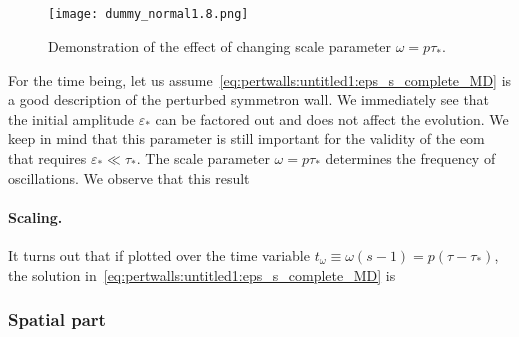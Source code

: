     
    

    
\begin{draft}
    

\subsection{}
    \begin{figure}[h]
        \centering
        \texttt{[image: dummy\_normal1.8.png]}
        \caption{Demonstration of the effect of changing scale parameter $\omega=p\tau_\ast$.}  
    \end{figure}
    For the time being, let us assume~\cref{eq:pertwalls:untitled1:eps_s_complete_MD} is a good description of the perturbed symmetron wall. We immediately see that the initial amplitude $\varepsilon_\ast$ can be factored out and does not affect the evolution. We keep in mind that this parameter is still important for the validity of the eom that requires $\varepsilon_\ast \ll \tau_\ast$. 
    The scale parameter $\omega=p\tau_\ast$ determines the frequency of oscillations. We observe that this result 
    
    \paragraph{Scaling.} %
    It turns out that if plotted over the time variable $t_\omega \equiv \omega(s-1)=p(\tau-\tau_\ast)$, the solution in~\cref{eq:pertwalls:untitled1:eps_s_complete_MD} is 

    \subsubsection{Spatial part}




\end{draft}
